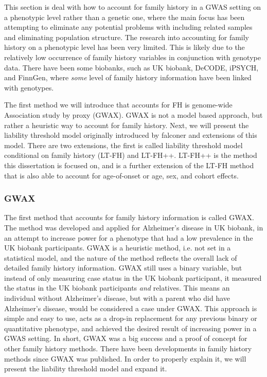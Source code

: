 
This section is deal with how to account for family history in a GWAS setting on a phenotypic level rather than a genetic one, where the main focus has been attempting to eliminate any potential problems with including related samples and eliminating population structure. The research into accounting for family history on a phenotypic level has been very limited. This is likely due to the relatively low occurrence of family history variables in conjunction with genotype data. There have been some biobanks, such as UK biobank, DeCODE, iPSYCH, and FinnGen, where \textit{some} level of family history information have been linked with genotypes. 

The first method we will introduce that accounts for FH is genome-wide Association study by proxy (GWAX). GWAX is not a model based approach, but rather a heuristic way to account for family history. Next, we will present the liability threshold model originally introduced by falconer\cite{falconer1965inheritance} and extensions of this model. There are two extensions, the first is called liability threshold model conditional on family history (LT-FH)\cite{hujoel2020liability} and LT-FH++. LT-FH++ is the method this dissertation is focused on, and is a further extension of the LT-FH method that is also able to account for age-of-onset or age, sex, and cohort effects. 

\subsubsection{GWAX}
The first method that accounts for family history information is called GWAX. The method was developed and applied for Alzheimer's disease in UK biobank, in an attempt to increase power for a phenotype that had a low prevalence in the UK biobank participants. GWAX is a heuristic method, i.e. not set in a statistical model, and the nature of the method reflects the overall lack of detailed family history information. GWAX still uses a binary variable, but instead of only measuring case status in the UK biobank participant, it measured the status in the UK biobank participants \textit{and} relatives. This means an individual without Alzheimer's disease, but with a parent who did have Alzheimer's disease, would be considered a case under GWAX. This approach is simple and easy to use, acts as a drop-in replacement for any previous binary or quantitative phenotype, and achieved the desired result of increasing power in a GWAS setting. In short, GWAX was a big success and a proof of concept for other family history methods. There have been developments in family history methods since GWAX was published. In order to properly explain it, we will present the liability threshold model and expand it.


